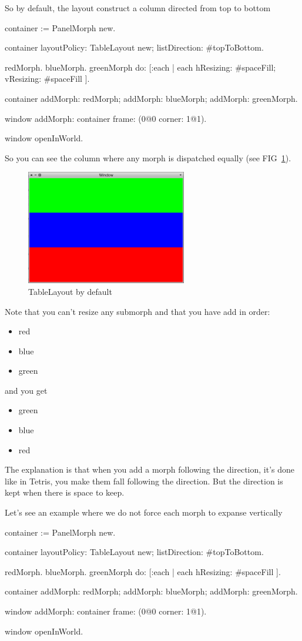 \documentclass[a4paper,10pt,twoside]{book}
\begin{document}
So by default, the layout construct a column directed from top to bottom
\begin{code}{}
container := PanelMorph new.

container 
	layoutPolicy: TableLayout new;
	listDirection: #topToBottom.

{ redMorph. blueMorph. greenMorph } do: [:each |
	each 
		hResizing: #spaceFill;
		vResizing: #spaceFill ].
	
container 
	addMorph: redMorph;
	addMorph: blueMorph;
	addMorph: greenMorph.

window
	addMorph: container
	frame: (0@0 corner: 1@1).

window openInWorld.
\end{code}

So you can see the column where any morph is dispatched equally (see FIG~\ref{fig:tableLayout1}).

\begin{figure}[ht]\centering
	\includegraphics[width=7cm]{TableLayout1}
	\caption{TableLayout by default}
	\label{fig:tableLayout1}
\end{figure}

Note that you can't resize any submorph and that you have add in order:
\begin{itemize}
	\item red
	\item blue
	\item green
\end{itemize}
and you get
\begin{itemize}
	\item green
	\item blue
	\item red
\end{itemize}

The explanation is that when you add a morph following the direction, it's done like in Tetris, you make them fall following the direction. But the direction is kept when there is space to keep.

Let's see an example where we do not force each morph to expanse vertically
\begin{code}{}
container := PanelMorph new.

container 
	layoutPolicy: TableLayout new;
	listDirection: #topToBottom.

{ redMorph. blueMorph. greenMorph } do: [:each |
	each 
		hResizing: #spaceFill ].
	
container 
	addMorph: redMorph;
	addMorph: blueMorph;
	addMorph: greenMorph.

window
	addMorph: container
	frame: (0@0 corner: 1@1).

window openInWorld.
\end{code}
\end{document}
